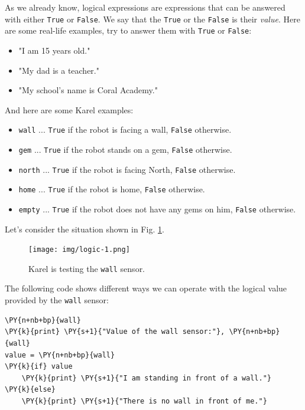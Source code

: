As we already know, logical expressions are expressions that can be answered with either {\tt True} or 
{\tt False}. We say that the {\tt True} or the {\tt False} is their {\em value}. Here are some 
real-life examples, try to answer them with {\tt True} or {\tt False}:

\begin{itemize}
\item "I am 15 years old."
\item "My dad is a teacher."
\item "My school's name is Coral Academy."
\end{itemize}
And here are some Karel examples:
\begin{itemize}
\item {\color{ForestGreen} \tt wall} ... {\tt True} if the robot is facing a wall, {\tt False} otherwise.
\item {\color{ForestGreen} \tt gem}  ... {\tt True} if the robot stands on a gem, {\tt False} otherwise.
\item {\color{ForestGreen} \tt north} ... {\tt True} if the robot is facing North, {\tt False} otherwise.
\item {\color{ForestGreen} \tt home} ... {\tt True} if the robot is home, {\tt False} otherwise.
\item {\color{ForestGreen} \tt empty} ... {\tt True} if the robot does not have any gems on him, {\tt False} otherwise.
\end{itemize}
Let's consider the situation shown in Fig. \ref{fig:logic1}.
\newpage

\begin{figure}[!ht]
\begin{center}
\texttt{[image: img/logic-1.png]}
\end{center}
\vspace{-2mm}
\caption{Karel is testing the {\tt wall} sensor.}
\label{fig:logic1}
\end{figure}
\noindent
The following code shows different ways we can operate with the 
logical value provided by the {\tt wall} sensor:\\

\begin{bbox}
\begin{Verbatim}[commandchars=\\\{\}]
\PY{n+nb+bp}{wall}
\PY{k}{print} \PY{s+1}{"Value of the wall sensor:"}, \PY{n+nb+bp}{wall}
value = \PY{n+nb+bp}{wall}
\PY{k}{if} value
    \PY{k}{print} \PY{s+1}{"I am standing in front of a wall."}
\PY{k}{else}
    \PY{k}{print} \PY{s+1}{"There is no wall in front of me."}
\end{Verbatim}
\end{bbox}
\vspace{6mm}

